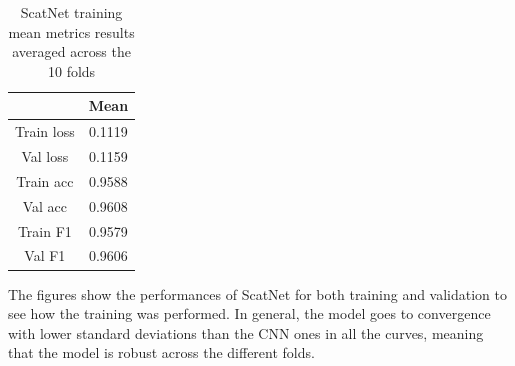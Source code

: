 \documentclass[11pt]{article}
\begin{document}
\begin{multicols*}{2}
\begin{table}[H]
    \centering
    \begin{tabular}{|c|c|}
        \hline
         & Mean \\
        \hline
        Train loss & 0.1119 \\
        \hline
        Val loss & 0.1159 \\
        \hline
        Train acc & 0.9588 \\
        \hline
        Val acc & 0.9608 \\
        \hline
        Train F1 & 0.9579 \\
        \hline
        Val F1 & 0.9606 \\
        \hline
    \end{tabular}
    \caption{ScatNet training mean metrics results averaged across the 10 folds}
    \label{tab:scat_training_metrics}
\end{table}

The figures show the performances of ScatNet for both training and validation to see how the training was performed. In general, the model goes to convergence with lower standard deviations than the CNN ones in all the curves, meaning that the model is robust across the different folds.


\end{multicols*}
\end{document}
